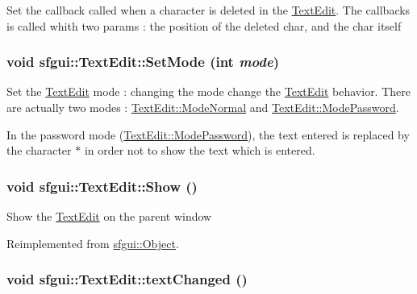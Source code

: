 Set the callback called when a character is deleted in the \hyperlink{classsfgui_1_1TextEdit}{TextEdit}. The callbacks is called whith two params : the position of the deleted char, and the char itself \hypertarget{classsfgui_1_1TextEdit_214a2f7f8dae54527ca354956ec4f06c}{
\subsubsection[SetMode]{\setlength{\rightskip}{0pt plus 5cm}void sfgui::TextEdit::SetMode (int {\em mode})}}
\label{classsfgui_1_1TextEdit_214a2f7f8dae54527ca354956ec4f06c}




Set the \hyperlink{classsfgui_1_1TextEdit}{TextEdit} mode : changing the mode change the \hyperlink{classsfgui_1_1TextEdit}{TextEdit} behavior. There are actually two modes : \hyperlink{classsfgui_1_1TextEdit_f57eb4d7008c723b438197b3d0a12694e3840cc3f77909c7d436d3b904d9113a}{TextEdit::ModeNormal} and \hyperlink{classsfgui_1_1TextEdit_f57eb4d7008c723b438197b3d0a126949acf4a0b80bbbc130112983c4d7c7988}{TextEdit::ModePassword}. \par
In the password mode (\hyperlink{classsfgui_1_1TextEdit_f57eb4d7008c723b438197b3d0a126949acf4a0b80bbbc130112983c4d7c7988}{TextEdit::ModePassword}), the text entered is replaced by the character $\ast$ in order not to show the text which is entered. \hypertarget{classsfgui_1_1TextEdit_1ee03247816213b34caaff365b160de0}{
\subsubsection[Show]{\setlength{\rightskip}{0pt plus 5cm}void sfgui::TextEdit::Show ()}}
\label{classsfgui_1_1TextEdit_1ee03247816213b34caaff365b160de0}




Show the \hyperlink{classsfgui_1_1TextEdit}{TextEdit} on the parent window 

Reimplemented from \hyperlink{classsfgui_1_1Object_cdf7f9b5f731e49e0e13e55de704805d}{sfgui::Object}.\hypertarget{classsfgui_1_1TextEdit_04bf790d96e0014479cc791691ecbade}{
\subsubsection[textChanged]{\setlength{\rightskip}{0pt plus 5cm}void sfgui::TextEdit::textChanged ()}}
\label{classsfgui_1_1TextEdit_04bf790d96e0014479cc791691ecbade}





